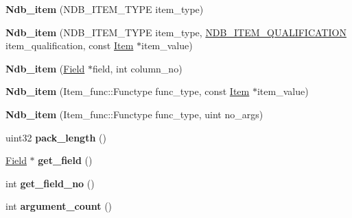 \begin{DoxyCompactItemize}
\item 
\mbox{\label{classNdb__item_aa67f893a2a3b0fb706697848059c32e1}} 
{\bfseries Ndb\+\_\+item} (N\+D\+B\+\_\+\+I\+T\+E\+M\+\_\+\+T\+Y\+PE item\+\_\+type)
\item 
\mbox{\label{classNdb__item_a2ee1452a4c578007b54ef7ec911d9270}} 
{\bfseries Ndb\+\_\+item} (N\+D\+B\+\_\+\+I\+T\+E\+M\+\_\+\+T\+Y\+PE item\+\_\+type, \mbox{\hyperlink{unionndb__item__qualification}{N\+D\+B\+\_\+\+I\+T\+E\+M\+\_\+\+Q\+U\+A\+L\+I\+F\+I\+C\+A\+T\+I\+ON}} item\+\_\+qualification, const \mbox{\hyperlink{classItem}{Item}} $\ast$item\+\_\+value)
\item 
\mbox{\label{classNdb__item_a82007ed733d34df5fdbab8d583ee2b1c}} 
{\bfseries Ndb\+\_\+item} (\mbox{\hyperlink{classField}{Field}} $\ast$field, int column\+\_\+no)
\item 
\mbox{\label{classNdb__item_a241adb62a26d86fe8d76144a1b6617f8}} 
{\bfseries Ndb\+\_\+item} (Item\+\_\+func\+::\+Functype func\+\_\+type, const \mbox{\hyperlink{classItem}{Item}} $\ast$item\+\_\+value)
\item 
\mbox{\label{classNdb__item_a60f8533b5eb7c63405d5001c8ebf4226}} 
{\bfseries Ndb\+\_\+item} (Item\+\_\+func\+::\+Functype func\+\_\+type, uint no\+\_\+args)
\item 
\mbox{\label{classNdb__item_a296fb27397ad2c4a0cf8e39352ae1583}} 
uint32 {\bfseries pack\+\_\+length} ()
\item 
\mbox{\label{classNdb__item_a65d12b1ebca40fdaa94a6f9cb5344d9e}} 
\mbox{\hyperlink{classField}{Field}} $\ast$ {\bfseries get\+\_\+field} ()
\item 
\mbox{\label{classNdb__item_a2396fb1755321097aa71fb697a4f89d2}} 
int {\bfseries get\+\_\+field\+\_\+no} ()
\item 
\mbox{\label{classNdb__item_ae0ca40affaa92da94beaa70755e5d901}} 
int {\bfseries argument\+\_\+count} ()
\item 
\mbox{\label{classNdb__item_af3dec517abecd0d996410e612665b8f9}} 

\end{DoxyCompactItemize}

